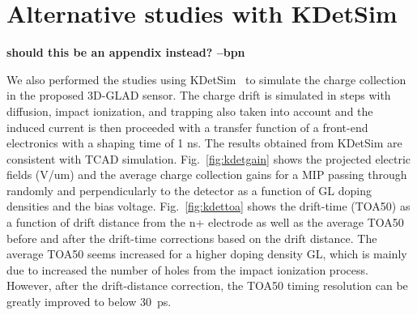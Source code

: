 \documentclass[aps,pt14,superscriptaddress,floatfix,nofootinbib]{revtex4}
\begin{document}
\section{Alternative studies with KDetSim} 

\textbf{should this be an appendix instead?  --bpn}

We also performed the studies using KDetSim~\cite{kdetsim} to simulate the charge collection in the proposed 3D-GLAD sensor.
The charge drift is simulated in steps with diffusion, impact ionization, and trapping also taken into account and  
the induced current is then proceeded with a transfer function of a front-end electronics with a shaping time of 1 ns. 
The results obtained from KDetSim are consistent with TCAD simulation. Fig.~\ref{fig:kdetgain} shows the projected 
electric fields (V/um) and the average charge collection gains for a MIP passing through randomly and perpendicularly 
to the detector as a function of GL doping densities and the bias voltage. Fig.~\ref{fig:kdettoa} shows the drift-time 
(TOA50) as a function of drift distance from the n+ electrode as well as the average TOA50 before and after the drift-time corrections based on the drift distance. The average TOA50 seems increased for a higher doping density GL, which is mainly 
due to increased the number of holes from the impact ionization process. However, after the drift-distance correction, the 
TOA50 timing resolution can be greatly improved to below 30~ps.  
     
\end{document}
